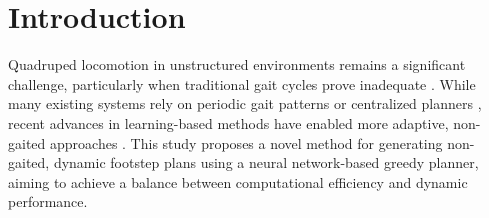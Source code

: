 \documentclass[../main.tex]{subfiles}
\begin{document}
\chapter{Introduction}
\label{chap:introduction}

Quadruped locomotion in unstructured environments remains a
significant challenge, particularly when traditional gait cycles
prove inadequate \cite{Chai2022survey}. While many existing systems
rely on periodic gait patterns or centralized planners
\cite{Chai2022survey}, recent advances in learning-based methods have
enabled more adaptive, non-gaited approaches
\cite{Fan2024survey}. This study
proposes a novel method for generating non-gaited, dynamic footstep
plans using a neural network-based greedy planner, aiming to achieve
a balance between computational efficiency and dynamic performance.






\end{document}
